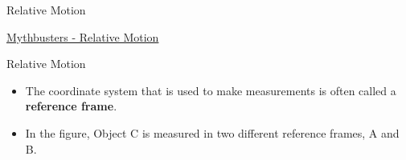 \documentclass{beamer}
\begin{document}
\begin{frame}{Relative Motion}
\begin{center}
   \Huge \href{https://www.youtube.com/watch?v=qQVDAMzo4mE}{Mythbusters - Relative Motion}
\end{center}
\end{frame}

\begin{frame}{Relative Motion}
\begin{itemize}
   \item The coordinate system that is used to make measurements is often called a {\bf reference frame}.
   \item<2-> In the figure, Object C is measured in two different reference frames, A and B.
\end{itemize}
\end{frame}
\end{document}

